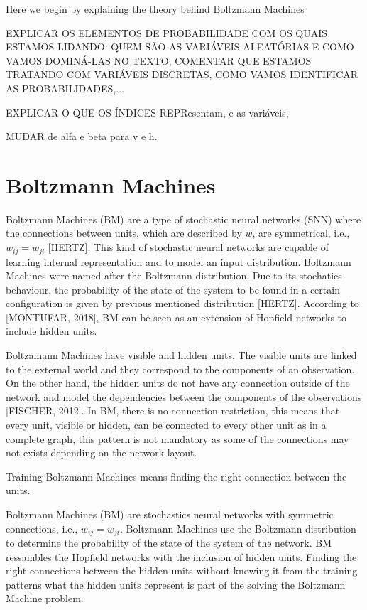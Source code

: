 Here we begin by explaining the theory behind Boltzmann Machines

EXPLICAR OS ELEMENTOS DE PROBABILIDADE COM OS QUAIS ESTAMOS LIDANDO:%
QUEM S\~{A}O AS VARI\'{A}VEIS ALEAT\'{O}RIAS E COMO VAMOS DOMIN\'{A}-LAS NO TEXTO, 
COMENTAR QUE ESTAMOS TRATANDO COM VARI\'{A}VEIS DISCRETAS, COMO VAMOS IDENTIFICAR AS PROBABILIDADES,$\ldots$

EXPLICAR O QUE OS \'{I}NDICES REPResentam, e as vari\'{a}veis,

MUDAR de alfa e beta para v e h.

\section{Boltzmann Machines}

Boltzmann Machines (BM) are a type of stochastic neural networks (SNN) where the connections between units, which are described by $w$, are symmetrical, i.e., $w_{ij} = w_{ji}$ [HERTZ]. 
This kind of stochastic neural networks are capable of learning internal representation and to model an input distribution. 
Boltzmann Machines were named after the Boltzmann distribution. 
Due to its stochatics behaviour, the probability of the state of the system to be found in a certain configuration is given by previous mentioned distribution [HERTZ]. 
According to [MONTUFAR, 2018], BM can be seen as an extension of Hopfield networks to include hidden units.


Boltzamann Machines have visible and hidden units. 
The visible units are linked to the external world and they correspond to the components of an observation. On the other hand, the hidden units do not have any connection outside of the network and model the dependencies between the components of the observations [FISCHER, 2012]. 
In BM, there is no connection restriction, this means that every unit, visible or hidden, can be connected to every other unit as in a complete graph, this pattern is not mandatory as some of the connections may not exists depending on the network layout.

Training Boltzmann Machines means finding the right connection between the units.

Boltzmann Machines (BM) are stochastics neural networks with symmetric connections, i.e., $w_{ij} = w_{ji}$. 
Boltzmann Machines use the Boltzmann distribution to determine the probability of the state of the system of the network. 
BM ressambles the Hopfield networks with the inclusion of hidden units. 
Finding the right connections between the hidden units without knowing it from the training patterns what the hidden units represent is part of the solving the Boltzmann Machine problem.

